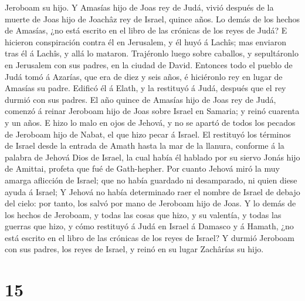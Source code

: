 Jeroboam su hijo.  Y Amasías hijo de Joas rey de Judá,
vivió después de la muerte de Joas hijo de Joachâz rey de Israel, quince
años.  Lo demás de los hechos de Amasías, ¿no está
escrito en el libro de las crónicas de los reyes de Judá?
 E hicieron conspiración contra él en Jerusalem, y él
huyó á Lachîs; mas enviaron tras él á Lachîs, y allá lo mataron.
 Trajéronlo luego sobre caballos, y sepultáronlo en
Jerusalem con sus padres, en la ciudad de David. 
Entonces todo el pueblo de Judá tomó á Azarías, que era de diez y seis
años, é hiciéronlo rey en lugar de Amasías su padre. 
Edificó él á Elath, y la restituyó á Judá, después que el rey durmió con
sus padres.  El año quince de Amasías hijo de Joas rey de
Judá, comenzó á reinar Jeroboam hijo de Joas sobre Israel en Samaria; y
reinó cuarenta y un años.  E hizo lo malo en ojos de
Jehová, y no se apartó de todos los pecados de Jeroboam hijo de Nabat,
el que hizo pecar á Israel.  El restituyó los términos de
Israel desde la entrada de Amath hasta la mar de la llanura, conforme á
la palabra de Jehová Dios de Israel, la cual había él hablado por su
siervo Jonás hijo de Amittai, profeta que fué de Gath-hepher.
 Por cuanto Jehová miró la muy amarga aflicción de
Israel; que no había guardado ni desamparado, ni quien diese ayuda á
Israel;  Y Jehová no había determinado raer el nombre de
Israel de debajo del cielo: por tanto, los salvó por mano de Jeroboam
hijo de Joas.  Y lo demás de los hechos de Jeroboam, y
todas las cosas que hizo, y su valentía, y todas las guerras que hizo, y
cómo restituyó á Judá en Israel á Damasco y á Hamath, ¿no está escrito
en el libro de las crónicas de los reyes de Israel?  Y
durmió Jeroboam con sus padres, los reyes de Israel, y reinó en su lugar
Zachârías su hijo.

\hypertarget{section-14}{%
\section{15}\label{section-14}}

